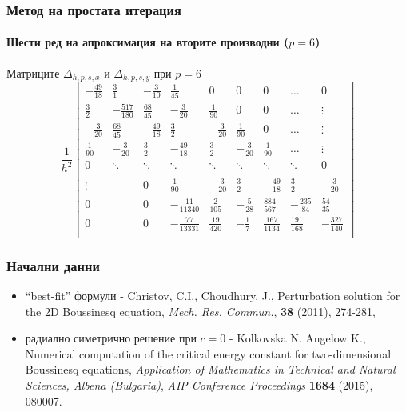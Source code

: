 \documentclass{beamer}
\begin{document}
\begin{frame}
\frametitle{Метод на простата итерация}
\framesubtitle{Шести ред на апроксимация на вторите производни ($p=6$) }
Матриците $\Delta_{h,p,s,x}$ и $\Delta_{h,p,s,y}$ при $p=6$
\[
\frac{1}{h^2}
\begin{bmatrix}
   -\frac{49}{18}		& \frac{3}{1}			&   -\frac{3}{10}		& \frac{1}{45}    		 &  0					& 0	   					&    0      	   	&   \dots           & 0    \\
    \frac{3}{2}    	&-\frac{517}{180}    	&    \frac{68}{45}     & -\frac{3}{20}  	 		& \frac{1}{90} 		&  0					 &   0      	   	&   \dots	       & \vdots  \\
    -\frac{3}{20}		& \frac{68}{45}         	& -\frac{49}{18} 	&  \frac{3}{2}		&  -\frac{3}{20}    	 &   \frac{1}{90}    	 &  0			&     \dots         &\vdots    \\
    \frac{1}{90}		& -\frac{3}{20}		& \frac{3}{2}         	& -\frac{49}{18} 	&  \frac{3}{2}		&  -\frac{3}{20}    	 &   \frac{1}{90} &     \dots         &\vdots    \\
        0           		& \ddots        		&         \ddots           	& \ddots        		&    \ddots   		&   \ddots      		 &     \ddots    	&  \ddots          &    0 \\	
\\
   \vdots      		&            		 	&    	0	      		& \frac{1}{90}		& -\frac{3}{20}		& \frac{3}{2}         	& -\frac{49}{18}	&  \frac{3}{2}  &  -\frac{3}{20} \\
    0      			&              	 	&    0      		&   -\frac{11}{11340}	 	&    \frac{2}{105} 	&  -\frac{5}{28} 	& \frac{884}{567} &-\frac{235}{84} &  \frac{54}{35}\\
    0              	& 	          		&    0              	&  -\frac{77}{13331}    		&  \frac{19}{420}&-\frac{1}{7}	 &  \frac{167}{1134} 	& \frac{191}{168}  &  -\frac{327}{140}\\
\end{bmatrix}
\]
\end{frame}

\begin{frame}
\frametitle{Начални данни}
\begin{itemize}
  \item ``best-fit'' формули - Christov, C.I., Choudhury, J., Perturbation solution for the 2D Boussinesq equation, {\it Mech. Res. Commun.}, \textbf{38} (2011), 274-281,
  \item радиално симетрично решение при $c=0$ - Kolkovska N. Angelow K., Numerical computation of the critical energy constant for two-dimensional Boussinesq equations, {\it Application of Mathematics in Technical and Natural Sciences, Albena (Bulgaria)},
\emph{AIP Conference Proceedings}  \textbf{1684} (2015), 080007.
\end{itemize}


\end{frame}
\end{document}
